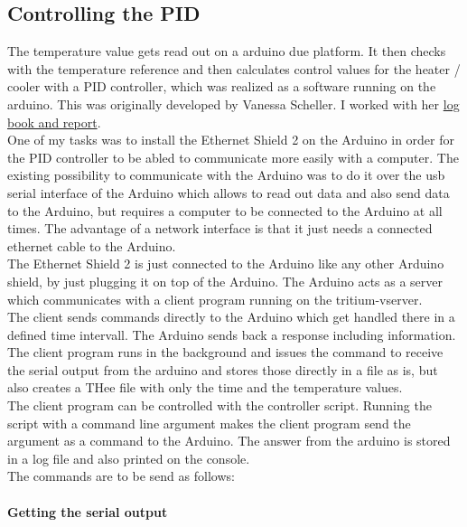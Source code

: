 \documentclass[12pt]{scrartcl}
\begin{document}
      \subsection{Controlling the PID}
      The temperature value gets read out on a arduino due platform. It then
      checks with the temperature reference and then calculates control values
      for the heater / cooler with a PID controller, which was realized as a
      software running on the arduino. This was originally developed by Vanessa
      Scheller. I worked with her
      \href{https://www.mpi-hd.mpg.de/THeWiki/index.php/Temperature_stabilization}{log book and report}.
      \\One of my tasks was to install the Ethernet Shield 2 on the Arduino in
      order for the PID controller to be abled to communicate more easily with
      a computer. The existing possibility to communicate with the Arduino was
      to do it over the usb serial interface of the Arduino which allows to
      read out data and also send data to the Arduino, but requires a computer
      to be connected to the Arduino at all times. The advantage of a network
      interface is that it just needs a connected ethernet cable to the Arduino.
      \\The Ethernet Shield 2 is just connected to the Arduino like any other
      Arduino shield, by just plugging it on top of the Arduino. The Arduino
      acts as a server which communicates with a client program
       running on the tritium-vserver.
      \\The client sends commands directly to the Arduino which get handled
      there in a defined time intervall. The Arduino sends back a response
      including information.
      \\The client program runs in the background and issues the command to
      receive the serial output from the arduino and stores those directly in
      a file as is, but also creates a THee file with only the time and the
      temperature values.
      \\The client program can be controlled with the
      controller script. Running the script with a
      command line argument makes the client program send the argument as a
      command to the Arduino. The answer from the arduino is stored in a log
      file and also printed on the console.
      \\The commands are to be send as follows:
      \\\\
      \textbf{Getting the serial output} \\
\end{document}
